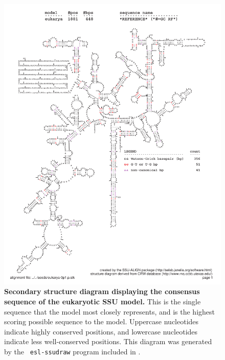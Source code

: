 \begin{figure}
\begin{center}
\includegraphics[width=5.7in]{Figures/eukarya-0p1-rf}
\end{center}
\caption[Secondary structure diagram displaying the consensus sequence
  of the eukaryotic SSU model]{\textbf{Secondary structure diagram displaying the
  consensus sequence of the eukaryotic SSU model.} 
  This is the single sequence that the model 
  most closely represents, and is the highest scoring possible
  sequence to the model. Uppercase nucleotides indicate highly conserved positions,
  and lowercase nucleotides indicate less well-conserved positions.
  This diagram was generated by the {\tt
  esl-ssudraw} program included in .}
\label{fig:eukrf}
\end{figure}

